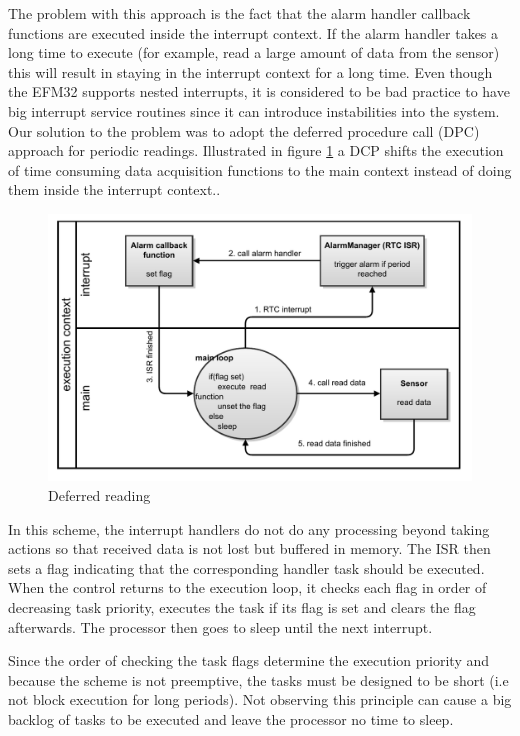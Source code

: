 The problem with this approach is the fact that the alarm handler callback functions are executed inside the interrupt context. If the alarm handler takes a long time to execute (for example, read a large amount of data from the sensor) this will result in staying in the interrupt context for a long time. Even though the EFM32 supports nested interrupts, it is considered to be bad practice to have big interrupt service routines since it can introduce instabilities into the system. Our solution to the problem was to adopt the deferred procedure call (DPC) approach for periodic readings. Illustrated in figure \ref{fig:deferred_reading} a DCP shifts the execution of time consuming data acquisition functions to the main context instead of doing them inside the interrupt context..

\begin{figure}[htb]
\centering
\includegraphics[width=\textwidth]{Images/deferred_reading}
\caption{Deferred reading}
\label{fig:deferred_reading}
\end{figure}

In this scheme, the interrupt handlers do not do any processing beyond taking actions so that received data is not lost but buffered in memory. The ISR then sets a flag indicating that the corresponding handler task should be executed. When the control returns to the execution loop, it checks each flag in order of decreasing task priority, executes the task if its flag is set and clears the flag afterwards. The processor then goes to sleep until the next interrupt.

Since the order of checking the task flags determine the execution priority and because the scheme is not preemptive, the tasks must be designed to be short (i.e not block execution for long periods). Not observing this principle can cause a big backlog of tasks to be executed and leave the processor no time to sleep.

